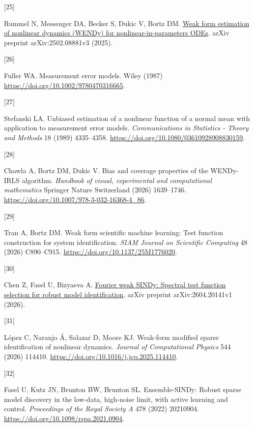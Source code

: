 \documentclass[
  american,
  11pt,
]{article}
\newlength{\cslhangindent}
\newlength{\csllabelwidth}
\newenvironment{CSLReferences}[2] %
 {\begin{list}{}{%
  \setlength{\itemindent}{0pt}
  \setlength{\leftmargin}{0pt}
  \setlength{\parsep}{0pt}
  \ifodd #1
   \setlength{\leftmargin}{\cslhangindent}
   \setlength{\itemindent}{-1\cslhangindent}
  \fi
  \setlength{\itemsep}{#2\baselineskip}}}
 {\end{list}}
\newcommand{\CSLLeftMargin}[1]{\parbox[t]{\csllabelwidth}{\strut#1\strut}}
\newcommand{\CSLRightInline}[1]{\parbox[t]{\linewidth - \csllabelwidth}{\strut#1\strut}}
\begin{document}
\begin{CSLReferences}{0}{0}
\CSLLeftMargin{{[}25{]} }%
\CSLRightInline{Rummel N, Messenger DA, Becker S, Dukic V, Bortz DM.
\href{https://arxiv.org/abs/2502.08881v3}{Weak form estimation of
nonlinear dynamics ({WENDy}) for nonlinear-in-parameters {ODEs}}. arXiv
preprint arXiv:2502.08881v3 (2025).}

\CSLLeftMargin{{[}26{]} }%
\CSLRightInline{Fuller WA. Measurement error models. Wiley (1987)
\url{https://doi.org/10.1002/9780470316665}.}

\CSLLeftMargin{{[}27{]} }%
\CSLRightInline{Stefanski LA. Unbiased estimation of a nonlinear
function of a normal mean with application to measurement error models.
\emph{Communications in Statistics - Theory and Methods} 18 (1989)
4335--4358. \url{https://doi.org/10.1080/03610928908830159}.}

\CSLLeftMargin{{[}28{]} }%
\CSLRightInline{Chawla A, Bortz DM, Dukic V. Bias and coverage
properties of the {WENDy-IRLS} algorithm. \emph{Handbook of visual,
experimental and computational mathematics} Springer Nature Switzerland
(2026) 1639--1746. \url{https://doi.org/10.1007/978-3-032-16368-4_86}.}

\CSLLeftMargin{{[}29{]} }%
\CSLRightInline{Tran A, Bortz DM. Weak form scientific machine learning:
Test function construction for system identification. \emph{SIAM Journal
on Scientific Computing} 48 (2026) C890--C915.
\url{https://doi.org/10.1137/25M1776020}.}

\CSLLeftMargin{{[}30{]} }%
\CSLRightInline{Chen Z, Fasel U, Bizyaeva A.
\href{https://arxiv.org/abs/2604.20141v1}{Fourier weak {SINDy}: Spectral
test function selection for robust model identification}. arXiv preprint
arXiv:2604.20141v1 (2026).}

\CSLLeftMargin{{[}31{]} }%
\CSLRightInline{López C, Naranjo Á, Salazar D, Moore KJ. Weak-form
modified sparse identification of nonlinear dynamics. \emph{Journal of
Computational Physics} 544 (2026) 114410.
\url{https://doi.org/10.1016/j.jcp.2025.114410}.}

\CSLLeftMargin{{[}32{]} }%
\CSLRightInline{Fasel U, Kutz JN, Brunton BW, Brunton SL.
Ensemble-{SINDy}: Robust sparse model discovery in the low-data,
high-noise limit, with active learning and control. \emph{Proceedings of
the Royal Society A} 478 (2022) 20210904.
\url{https://doi.org/10.1098/rspa.2021.0904}.}


\end{CSLReferences}
\end{document}
